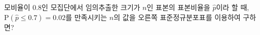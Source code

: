 \noindent\begin{minipage}[t]{0.58\linewidth}\vspace{0pt}\raggedright 모비율이 $0.8$인 모집단에서 임의추출한 크기가 $n$인 표본의 표본비율을 $\hat{p}$이라 할 때, $\mathrm{P}(\hat{p}\le 0.7)=0.02$를 만족시키는 $n$의 값을 오른쪽 표준정규분포표를 이용하여 구하면?\end{minipage}\hfill\begin{minipage}[t]{0.4\linewidth}\vspace{0pt}\centering \resizebox{\ifdim\width>\linewidth\linewidth\else\width\fi}{!}{}\end{minipage}\par
{}
